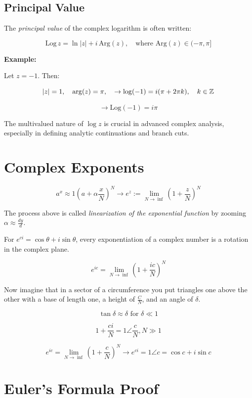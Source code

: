 \subsection{Principal Value}

The \emph{principal value} of the complex logarithm is often written:

\[
	\mathrm{Log}\,z = \ln |z| + i\,\mathrm{Arg}(z), \quad \text{where } \mathrm{Arg}(z) \in (-\pi, \pi]
\]

\textbf{Example:}

Let \( z = -1 \). Then:

\[
	|z| = 1, \quad \arg(z) = \pi, \quad \to \log(-1) = i(\pi + 2\pi k), \quad k \in \mathbb{Z}
\]

\[
	\to \mathrm{Log}(-1) = i\pi
\]

The multivalued nature of \( \log z \) is crucial in advanced complex analysis, especially in defining 
analytic continuations and branch cuts.

\section{Complex Exponents}

\[
	a^x \approx 1 {\left(a + \alpha \frac{x}{N} \right)}^N \to e^z := \lim_{N \rightarrow \inf} 
	{\left( 1 + \frac{z}{N}\right)}^N 
\] 

The process above is called \emph{linearization of the exponential function} by zooming \(\alpha \approx \frac{dy}{d}\).

For \(e^{ci} = \cos{\theta} + i\sin{\theta}\), every exponentiation of a complex number is a rotation 
in the complex plane.

\[
	e^{ic} = \lim_{N \to \inf} {\left( 1 + \frac{ic}{N}\right)}^N
\]

Now imagine that in a sector of a circumference you put triangles one above the other with a base of 
length one, a height of \(\frac{C}{N}\), and an angle of \(\delta\).

\[
	\tan{\delta} \approx \delta \text{ for } \delta \ll 1
\]

\[
	1 + \frac{ci}{N} = 1 \angle \frac{c}{N}, N \gg 1
\]

\[
	e^{ic} = \lim_{N \to \inf} {\left( 1 + \frac{c}{N}\right)}^N \to e^{ci} = 1 \angle c = \cos{c} + 
	i\sin{c}
\]

\section{Euler's Formula Proof}

